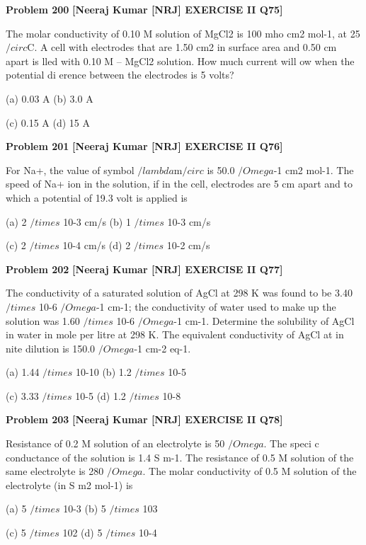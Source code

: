 \begin{problembox}
\textbf{Problem 200} \hfill \textbf{[Neeraj Kumar [NRJ] EXERCISE II Q75]}
\label{q:ext-nrj_all_questions-200}

The molar conductivity of 0.10 M solution of 
MgCl2 is 100 mho cm2 mol-1, at 25$/circ$C. A cell with 
electrodes that are 1.50 cm2 in surface area and 0.50 
cm apart is   lled with 0.10 M -- MgCl2 solution. 
How much current will   ow when the potential 
di  erence between the electrodes is 5 volts?
 
 (a) 0.03 A 
(b) 3.0 A
 
 (c) 0.15 A 
(d) 15 A
\end{problembox}

\begin{problembox}
\textbf{Problem 201} \hfill \textbf{[Neeraj Kumar [NRJ] EXERCISE II Q76]}
\label{q:ext-nrj_all_questions-201}

For Na+, the value of symbol $/lambda$m$/circ$ is 50.0 $/Omega$-1 cm2 
mol-1. The speed of Na+ ion in the solution, if in 
the cell, electrodes are 5 cm apart and to which a 
potential of 19.3 volt is applied is
 
 (a) 2 $/times$ 10-3 cm/s 
(b) 1 $/times$ 10-3 cm/s
 
 (c) 2 $/times$ 10-4 cm/s 
(d) 2 $/times$ 10-2 cm/s
\end{problembox}

\begin{problembox}
\textbf{Problem 202} \hfill \textbf{[Neeraj Kumar [NRJ] EXERCISE II Q77]}
\label{q:ext-nrj_all_questions-202}

The conductivity of a saturated solution of AgCl 
at 298 K was found to be 3.40 $/times$ 10-6 $/Omega$-1 cm-1; the 
conductivity of water used to make up the solution 
was 1.60 $/times$ 10-6 $/Omega$-1 cm-1. Determine the solubility 
of AgCl in water in mole per litre at 298 K. The 
equivalent conductivity of AgCl at in  nite dilution 
is 150.0 $/Omega$-1 cm-2 eq-1.
 
 (a) 1.44 $/times$ 10-10 
(b) 1.2 $/times$ 10-5
 
 (c) 3.33 $/times$ 10-5 
(d) 1.2 $/times$ 10-8
\end{problembox}

\begin{problembox}
\textbf{Problem 203} \hfill \textbf{[Neeraj Kumar [NRJ] EXERCISE II Q78]}
\label{q:ext-nrj_all_questions-203}

Resistance of 0.2 M solution of an electrolyte is 50 
$/Omega$. The speci  c conductance of the solution is 1.4 S 
m-1. The resistance of 0.5 M solution of the same 
electrolyte is 280 $/Omega$. The molar conductivity of 
0.5 M solution of the electrolyte (in S m2 mol-1) is
 
 (a) 5 $/times$ 10-3 
(b) 5 $/times$ 103
 
 (c) 5 $/times$ 102 
(d) 5 $/times$ 10-4
\end{problembox}

